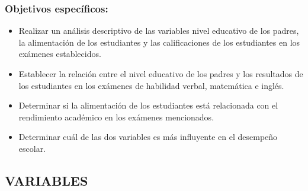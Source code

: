 \documentclass[
]{article}
\begin{document}
\subsubsection{Objetivos específicos:}\label{objetivos-especuxedficos}

\begin{itemize}
\item
  Realizar un análisis descriptivo de las variables nivel educativo de
  los padres, la alimentación de los estudiantes y las calificaciones de
  los estudiantes en los exámenes establecidos.
\item
  Establecer la relación entre el nivel educativo de los padres y los
  resultados de los estudiantes en los exámenes de habilidad verbal,
  matemática e inglés.
\item
  Determinar si la alimentación de los estudiantes está relacionada con
  el rendimiento académico en los exámenes mencionados.
\item
  Determinar cuál de las dos variables es más influyente en el desempeño
  escolar.
\end{itemize}

\subsection{VARIABLES}\label{variables}
\end{document}
